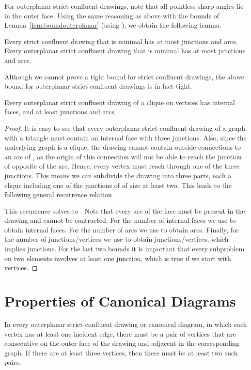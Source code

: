 \documentclass{llncs}
\begin{document}
For outerplanar strict confluent drawings, note that all pointless sharp angles lie in the outer face. Using the same reasoning as above with the bounds of Lemma~\ref{lem:boundouterplanar} (using ), we obtain the following lemma.
\begin{lemma}\label{lem:boundminimal}
Every strict confluent drawing that is minimal has at most  junctions and  arcs. Every outerplanar strict confluent drawing that is minimal has at most  junctions and  arcs.
\end{lemma}
Although we cannot prove a tight bound for strict confluent drawings, the above bound for outerplanar strict confluent drawings is in fact tight.
\begin{lemma}
Every outerplanar strict confluent drawing of a clique on  vertices has  internal faces, and at least  junctions and  arcs.
\end{lemma}
\begin{proof}
It is easy to see that every outerplanar strict confluent drawing of a graph with a triangle must contain an internal face  with three junctions. Also, since the underlying graph is a clique, the drawing cannot contain outside connections to an arc of , as the origin of this connection will not be able to reach the junction of  opposite of the arc. Hence, every vertex must reach  through one of the three junctions. This means we can subdivide the drawing into three parts, each a clique including one of the junctions of  of size at least two. This leads to the following general recurrence relation

This recurrence solves to . Note that every arc of the face  must be present in the drawing and cannot be contracted. For the number of internal faces we use  to obtain  internal faces. For the number of arcs we use  to obtain  arcs. Finally, for the number of junctions/vertices we use  to obtain  junctions/vertices, which implies  junctions. For the last two bounds it is important that every subproblem on two elements involves at least one junction, which is true if we start with  vertices.
\end{proof}

\section{Properties of Canonical Diagrams} \label {app:canonical}

\begin{lemma}
\label{lem:consecutive}
In every outerplanar strict confluent drawing or canonical diagram, in which each vertex has at least one incident edge, there must be a pair of  vertices that are consecutive on the outer face of the drawing and adjacent in the corresponding graph. If there are at least three vertices, then there must be at least two such pairs.
\end{lemma}
\end{document}
